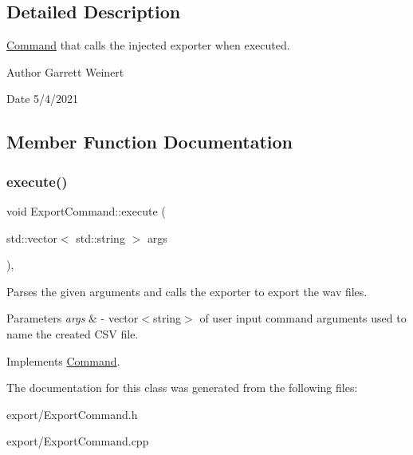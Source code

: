 \subsection{Detailed Description}
\hyperlink{classCommand}{Command} that calls the injected exporter when executed. \begin{DoxyAuthor}{Author}
Garrett Weinert 
\end{DoxyAuthor}
\begin{DoxyDate}{Date}
5/4/2021 
\end{DoxyDate}


\subsection{Member Function Documentation}
\mbox{\label{classExportCommand_ac06d7e8b8114b543efd03879f9825a7c}} 
\subsubsection{\texorpdfstring{execute()}{execute()}}
{\footnotesize\ttfamily void Export\+Command\+::execute (\begin{DoxyParamCaption}\item[{std\+::vector$<$ std\+::string $>$}]{args }\end{DoxyParamCaption})\hspace{0.3cm}{\ttfamily [override]}, {\ttfamily [virtual]}}

Parses the given arguments and calls the exporter to export the wav files. 
\begin{DoxyParams}{Parameters}
{\em args} & -\/ vector$<$string$>$ of user input command arguments used to name the created C\+SV file. \\
\hline
\end{DoxyParams}


Implements \hyperlink{classCommand}{Command}.



The documentation for this class was generated from the following files\+:\begin{DoxyCompactItemize}
\item 
export/Export\+Command.\+h\item 
export/Export\+Command.\+cpp\end{DoxyCompactItemize}
